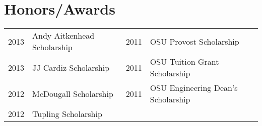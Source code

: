 \documentclass[10pt]{article}
\begin{document}
\section{Honors/Awards}
\begin{tabularx}{\textwidth}{@{}r|X l|l@{}}
2013 & Andy Aitkenhead Scholarship &
2011 & OSU Provost Scholarship \\

2013 & JJ Cardiz Scholarship &
2011 & OSU Tuition Grant Scholarship \\

2012 & McDougall Scholarship &
2011 & OSU Engineering Dean's Scholarship \\

2012 & Tupling Scholarship &
     & \\
\end{tabularx}


% 
\end{document}
